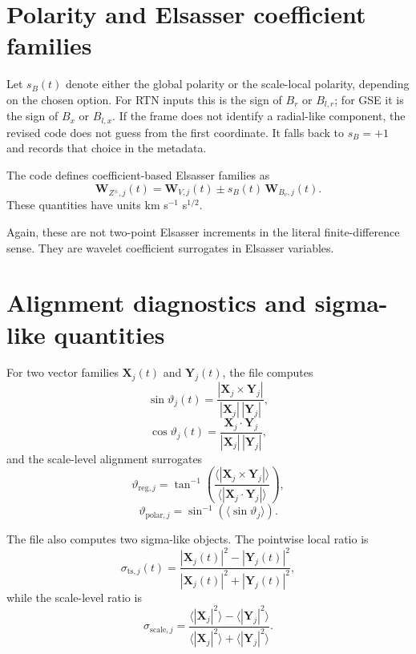\documentclass[11pt]{article}
\begin{document}
\section{Polarity and Elsasser coefficient families}

Let $s_B(t)$ denote either the global polarity or the scale-local polarity, depending on the chosen option. For RTN inputs this is the sign of $B_r$ or $B_{l,r}$; for GSE it is the sign of $B_x$ or $B_{l,x}$. If the frame does not identify a radial-like component, the revised code does not guess from the first coordinate. It falls back to $s_B=+1$ and records that choice in the metadata.

The code defines coefficient-based Elsasser families as
\begin{equation}
 \mathbf{W}_{Z^{\pm},j}(t) = \mathbf{W}_{V,j}(t) \pm s_B(t) \, \mathbf{W}_{B_v,j}(t).
\end{equation}
These quantities have units km s$^{-1}$ s$^{1/2}$.

Again, these are not two-point Elsasser increments in the literal finite-difference sense. They are wavelet coefficient surrogates in Elsasser variables.

\section{Alignment diagnostics and sigma-like quantities}

For two vector families $\mathbf{X}_j(t)$ and $\mathbf{Y}_j(t)$, the file computes
\begin{equation}
 \sin \vartheta_j(t) = \frac{|\mathbf{X}_j \times \mathbf{Y}_j|}{|\mathbf{X}_j| \, |\mathbf{Y}_j|},
\end{equation}
\begin{equation}
 \cos \vartheta_j(t) = \frac{\mathbf{X}_j \cdot \mathbf{Y}_j}{|\mathbf{X}_j| \, |\mathbf{Y}_j|},
\end{equation}
and the scale-level alignment surrogates
\begin{equation}
 \vartheta_{\mathrm{reg},j} = \tan^{-1}\!\left( \frac{\langle |\mathbf{X}_j \times \mathbf{Y}_j| \rangle}{\langle |\mathbf{X}_j \cdot \mathbf{Y}_j| \rangle} \right),
\end{equation}
\begin{equation}
 \vartheta_{\mathrm{polar},j} = \sin^{-1}\!\left( \langle \sin \vartheta_j \rangle \right).
\end{equation}

The file also computes two sigma-like objects. The pointwise local ratio is
\begin{equation}
 \sigma_{\mathrm{ts},j}(t) = \frac{|\mathbf{X}_j(t)|^2 - |\mathbf{Y}_j(t)|^2}{|\mathbf{X}_j(t)|^2 + |\mathbf{Y}_j(t)|^2},
\end{equation}
while the scale-level ratio is
\begin{equation}
 \sigma_{\mathrm{scale},j} = \frac{\langle |\mathbf{X}_j|^2 \rangle - \langle |\mathbf{Y}_j|^2 \rangle}{\langle |\mathbf{X}_j|^2 \rangle + \langle |\mathbf{Y}_j|^2 \rangle}.
\end{equation}
\end{document}
